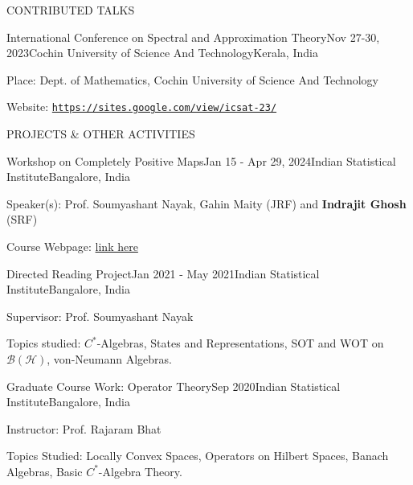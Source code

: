 \documentclass{resume} %
\newcommand{\weblink}[1]{\texttt{\href{#1}{#1}}}
\begin{document}
\begin{rSection}{CONTRIBUTED TALKS}
	
	\begin{rSubsection}{International Conference on Spectral and Approximation Theory}{Nov 27-30, 2023}{Cochin University of Science And Technology}{Kerala, India}
		\item Place: Dept. of Mathematics, Cochin University of Science And Technology 
		\item Website: \weblink{https://sites.google.com/view/icsat-23/}
	\end{rSubsection}
	
\end{rSection}


\begin{rSection}{PROJECTS \& OTHER ACTIVITIES}
	
	\begin{rSubsection}{Workshop on Completely Positive Maps}{Jan 15 - Apr 29, 2024}{Indian Statistical Institute}{Bangalore, India}
		\item Speaker(s): Prof. Soumyashant Nayak, Gahin Maity (JRF) and {\bf Indrajit Ghosh} (SRF)
		\item Course Webpage: \href{https://indrajitghosh.onrender.com/teaching/isibc/intro_to_cp_even_2024.html}{link here}
	\end{rSubsection}
	
	\begin{rSubsection}{Directed Reading Project}{Jan 2021 - May 2021}{Indian Statistical Institute}{Bangalore, India}
		\item Supervisor: Prof. Soumyashant Nayak
		\item Topics studied: $C^*$-Algebras, States and Representations, SOT and WOT on $\mathcal{B}(\mathcal{H})$, von-Neumann Algebras.
	\end{rSubsection}

	\begin{rSubsection}{Graduate Course Work: Operator Theory}{Sep 2020}{Indian Statistical Institute}{Bangalore, India}
		\item Instructor: Prof. Rajaram Bhat
		\item Topics Studied: Locally Convex Spaces, Operators on Hilbert Spaces, Banach Algebras, Basic $C^*$-Algebra Theory.
	\end{rSubsection}

\end{rSection}
\end{document}
